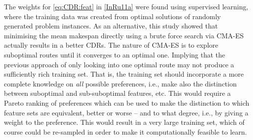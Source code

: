 The weights for \cref{eq:CDR:feat} in \cref{InRu11a} were found using 
supervised learning, where the training data was created from optimal solutions 
of randomly generated problem instances. As an alternative, this study showed  
that minimising the mean makespan directly using a brute force search via 
CMA-ES actually results in a better CDRs. The nature of CMA-ES is to explore 
suboptimal routes until it converges to an optimal one. Implying that the 
previous approach of only looking into one optimal route may not produce a 
sufficiently rich training set. That is, the training set should incorporate a 
more complete knowledge on \emph{all} possible preferences, i.e., make also the 
distinction between suboptimal and sub-suboptimal features, etc.  This would 
require a Pareto ranking of preferences which can be used to make the 
distinction to which feature sets are equivalent, better or worse -- and to 
what degree, i.e., by giving a weight to the preference. This would result in a 
very large training set, which of course could be re-sampled in order to make 
it computationally feasible to learn.

